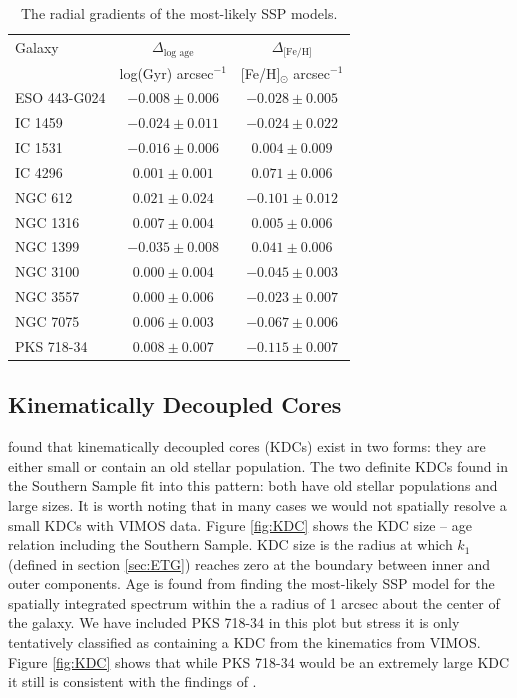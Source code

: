 			\begin{table}
				\centering
				\caption{The radial gradients of the most-likely SSP models.}
				\label{tab:popGrad}
				\begin{tabular}{l c c}
					\hline
					\hline 
					Galaxy 	& $\Delta_\text{log age}$ & $\Delta_\text{[Fe/H]}$ \\ 
						& log(Gyr) arcsec$^{-1}$ & [Fe/H]$_\odot$ arcsec$^{-1}$ \\
					\hline
					ESO 443-G024 & $-0.008 \pm 0.006$ & $-0.028 \pm 0.005$ \\
					IC 1459 	& $-0.024 \pm 0.011$ & $-0.024 \pm 0.022$ \\
					IC 1531 	& $-0.016 \pm 0.006$ & $0.004 \pm 0.009$ \\
					IC 4296		& $0.001 \pm 0.001$ & $0.071 \pm 0.006$ \\
					NGC 612 	& $0.021 \pm 0.024$ & $-0.101 \pm 0.012$ \\
					NGC 1316 	& $0.007 \pm 0.004$ & $0.005 \pm 0.006$ \\
					NGC 1399 	& $-0.035 \pm 0.008$ & $0.041 \pm 0.006$ \\
					NGC 3100 	& $0.000 \pm 0.004$ & $-0.045 \pm 0.003$ \\
					NGC 3557 	& $0.000 \pm 0.006$ & $-0.023 \pm 0.007$ \\
					NGC 7075 	& $0.006 \pm 0.003$ & $-0.067 \pm 0.006$ \\
					PKS 718-34  & $0.008 \pm 0.007$ & $-0.115 \pm 0.007$ \\
					\hline
					\hline
				\end{tabular}
			\end{table}



	\subsection{Kinematically Decoupled Cores}
		\label{subsec:popKDC}

		\citet{Kuntschner2010} found that kinematically decoupled cores (KDCs) exist in two forms: they are either small or contain an old stellar population. The two definite KDCs found in the Southern Sample fit into this pattern: both have old stellar populations and large sizes. It is worth noting that in many cases we would not spatially resolve a small KDCs with VIMOS data. Figure \ref{fig:KDC} shows the KDC size -- age relation including the Southern Sample. KDC size is the radius at which $k_1$ (defined in section \ref{sec:ETG}) reaches zero at the boundary between inner and outer components. Age is found from finding the most-likely SSP model for the spatially integrated spectrum within the a radius of 1 arcsec about the center of the galaxy. We have included PKS 718-34 in this plot but stress it is only tentatively classified as containing a KDC from the kinematics from VIMOS. Figure \ref{fig:KDC} shows that while PKS 718-34 would be an extremely large KDC it still is consistent with the findings of \citet{Kuntschner2010}.

